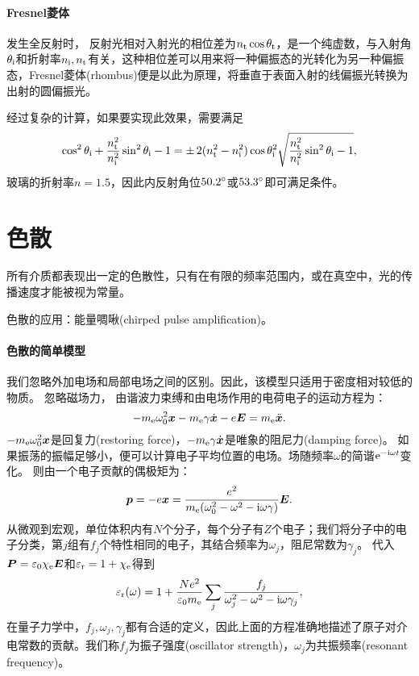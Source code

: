 \paragraph{Fresnel菱体}
发生全反射时，
反射光相对入射光的相位差为$n_\text t\cos\theta_\text t$，是一个纯虚数，与入射角$\theta_{\mathrm{i}}$和折射率$n_{\mathrm{i}},n_\text t$有关，这种相位差可以用来将一种偏振态的光转化为另一种偏振态，Fresnel菱体(rhombus)便是以此为原理，将垂直于表面入射的线偏振光转换为出射的圆偏振光。

经过复杂的计算，如果要实现此效果，需要满足
\[
    \cos^2\theta_{\mathrm{i}}+\frac{n_\text t^2}{n_{\mathrm{i}}^2}\sin^2\theta_{\mathrm{i}}-1=\pm\,2(n_\text t^2-n_{\mathrm{i}}^2)\cos\theta_{\mathrm{i}}^2\sqrt{\frac{n_\text t^2}{n_{\mathrm{i}}^2}\sin^2\theta_{\mathrm{i}}-1},
\]
玻璃的折射率$n=1.5$，因此内反射角位$50.2^\circ$或$53.3^\circ$即可满足条件。
\iffalse
\paragraph{垂直入射}
如果光是垂直界面入射的，$\theta_\i=\theta_\t=0$，则 
\begin{align*}
    r&=\frac{n_\i-n_\t}{n_\i+n_\t},\\
    t&=\frac{2n_\i}{n_\i+n_\t}.
\end{align*}
\fi
\section{色散}
所有介质都表现出一定的色散性，只有在有限的频率范围内，或在真空中，光的传播速度才能被视为常量。

色散的应用：能量啁啾(chirped pulse amplification)。
\paragraph{色散的简单模型}
我们忽略外加电场和局部电场之间的区别。因此，该模型只适用于密度相对较低的物质。
忽略磁场力，
由谐波力束缚和由电场作用的电荷电子的运动方程为：
\[
    -m_\mathrm e\omega_0^2\bm x-m_\mathrm e\gamma\dot{\bm x}-e\bm E=m_\mathrm e\ddot{\bm x}.
\]
$-m_\mathrm e\omega_0^2\bm x$是回复力(restoring force)，$-m_\mathrm e\gamma\dot{\bm x}$是唯象的阻尼力(damping force)。
如果振荡的振幅足够小，便可以计算电子平均位置的电场。场随频率$\omega$的简谐$\mathop{}\!\mathrm{e}^{-\mathrm{i}\omega t}$变化。
则由一个电子贡献的偶极矩为：
\[
    \bm p=-e\bm x=\frac{e^2}{m_\mathrm e(\omega_0^2-\omega^2-\mathrm{i}\omega\gamma)}\bm E.
\]
从微观到宏观，单位体积内有$N$个分子，每个分子有$Z$个电子；我们将分子中的电子分类，第$j$组有$f_j$个特性相同的电子，其结合频率为$\omega_j$，阻尼常数为$\gamma_j$。
代入$\bm P=\varepsilon_0\chi_\mathrm e\bm E$和$\varepsilon_\text r=1+\chi_\mathrm e$得到
\begin{equation}
    \varepsilon_\text r(\omega)=1+\frac{Ne^2}{\varepsilon_0m_\mathrm e}\sum_j\frac{f_j}{\omega_j^2-\omega^2-\mathrm{i}\omega\gamma_j},
\end{equation}
在量子力学中，$f_j,\omega_j,\gamma_j$都有合适的定义，因此上面的方程准确地描述了原子对介电常数的贡献。我们称$f_j$为振子强度(oscillator strength)，$\omega_j$为共振频率(resonant frequency)。
